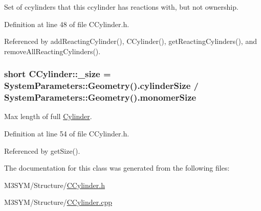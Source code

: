 Set of ccylinders that this ccylinder has reactions with, but not ownership. 



Definition at line 48 of file C\+Cylinder.\+h.



Referenced by add\+Reacting\+Cylinder(), C\+Cylinder(), get\+Reacting\+Cylinders(), and remove\+All\+Reacting\+Cylinders().

\hypertarget{classCCylinder_a9951ded0fd9d228a2358bee18f8b61b6}{
\subsubsection[{\+\_\+size}]{\setlength{\rightskip}{0pt plus 5cm}short C\+Cylinder\+::\+\_\+size = {\bf System\+Parameters\+::\+Geometry}().cylinder\+Size / {\bf System\+Parameters\+::\+Geometry}().monomer\+Size\hspace{0.3cm}{\ttfamily [private]}}}\label{classCCylinder_a9951ded0fd9d228a2358bee18f8b61b6}


Max length of full \hyperlink{classCylinder}{Cylinder}. 



Definition at line 54 of file C\+Cylinder.\+h.



Referenced by get\+Size().



The documentation for this class was generated from the following files\+:\begin{DoxyCompactItemize}
\item 
M3\+S\+Y\+M/\+Structure/\hyperlink{CCylinder_8h}{C\+Cylinder.\+h}\item 
M3\+S\+Y\+M/\+Structure/\hyperlink{CCylinder_8cpp}{C\+Cylinder.\+cpp}\end{DoxyCompactItemize}
